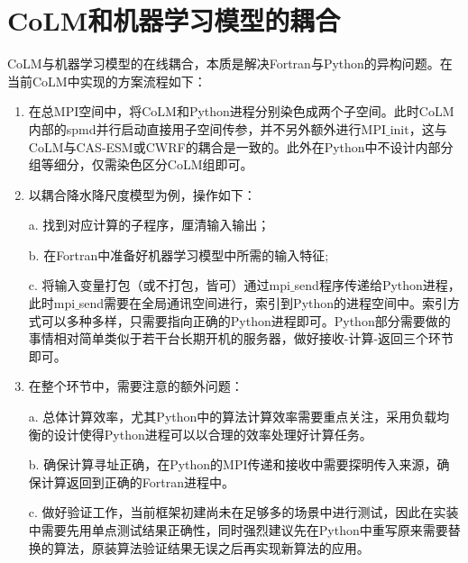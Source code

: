 \section{CoLM和机器学习模型的耦合}\label{CoLM和机器学习模型在线耦合}
CoLM与机器学习模型的在线耦合，本质是解决Fortran与Python的异构问题。在当前CoLM中实现的方案流程如下：
\begin{enumerate}
    \item 在总MPI空间中，将CoLM和Python进程分别染色成两个子空间。此时CoLM内部的spmd并行启动直接用子空间传参，并不另外额外进行MPI$\_$init，这与CoLM与CAS-ESM或CWRF的耦合是一致的。此外在Python中不设计内部分组等细分，仅需染色区分CoLM组即可。
    \item 以耦合降水降尺度模型为例，操作如下：
    
    a. 找到对应计算的子程序，厘清输入输出；
    
    b. 在Fortran中准备好机器学习模型中所需的输入特征; 
    
    c. 将输入变量打包（或不打包，皆可）通过mpi$\_$send程序传递给Python进程，此时mpi$\_$send需要在全局通讯空间进行，索引到Python的进程空间中。索引方式可以多种多样，只需要指向正确的Python进程即可。Python部分需要做的事情相对简单类似于若干台长期开机的服务器，做好接收-计算-返回三个环节即可。
    \item 在整个环节中，需要注意的额外问题：
    
    a. 总体计算效率，尤其Python中的算法计算效率需要重点关注，采用负载均衡的设计使得Python进程可以以合理的效率处理好计算任务。
    
    b. 确保计算寻址正确，在Python的MPI传递和接收中需要探明传入来源，确保计算返回到正确的Fortran进程中。
    
    c. 做好验证工作，当前框架初建尚未在足够多的场景中进行测试，因此在实装中需要先用单点测试结果正确性，同时强烈建议先在Python中重写原来需要替换的算法，原装算法验证结果无误之后再实现新算法的应用。
\end{enumerate}

